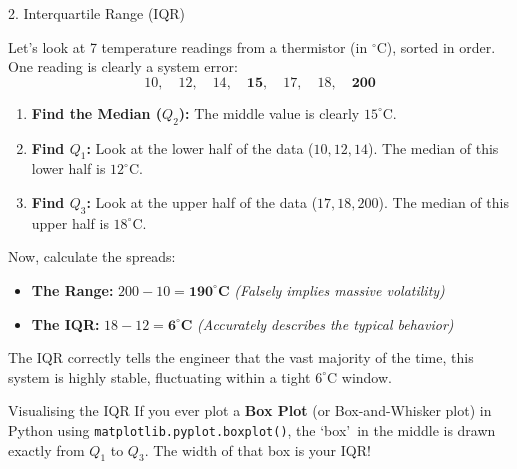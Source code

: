\begin{frame}{2. Interquartile Range (IQR)}
{        \begin{example}
            Let's look at 7 temperature readings from a thermistor (in $^\circ\text{C}$), sorted in order. One reading is clearly a system error:
            \[ 10, \quad 12, \quad 14, \quad \mathbf{15}, \quad 17, \quad 18, \quad \mathbf{200} \]
            
            \begin{enumerate}
                \item \textbf{Find the Median ($Q_2$):} The middle value is clearly $15^\circ\text{C}$.
                \item \textbf{Find $Q_1$:} Look at the lower half of the data ($10, 12, 14$). The median of this lower half is $12^\circ\text{C}$.
                \item \textbf{Find $Q_3$:} Look at the upper half of the data ($17, 18, 200$). The median of this upper half is $18^\circ\text{C}$.
            \end{enumerate}
            
            Now, calculate the spreads:
            \begin{itemize}
                \item \textbf{The Range:} $200 - 10 = \mathbf{190^\circ\text{C}}$ \textit{(Falsely implies massive volatility)}
                \item \textbf{The IQR:} $18 - 12 = \mathbf{6^\circ\text{C}}$ \textit{(Accurately describes the typical behavior)}
            \end{itemize}
            
            The IQR correctly tells the engineer that the vast majority of the time, this system is highly stable, fluctuating within a tight $6^\circ\text{C}$ window.
        \end{example}

        \begin{block}{Visualising the IQR}
            If you ever plot a \textbf{Box Plot} (or Box-and-Whisker plot) in Python using \texttt{matplotlib.pyplot.boxplot()}, the \lq box\rq\ in the middle is drawn exactly from $Q_1$ to $Q_3$. The width of that box is your IQR!
        \end{block}
    }
\end{frame}

